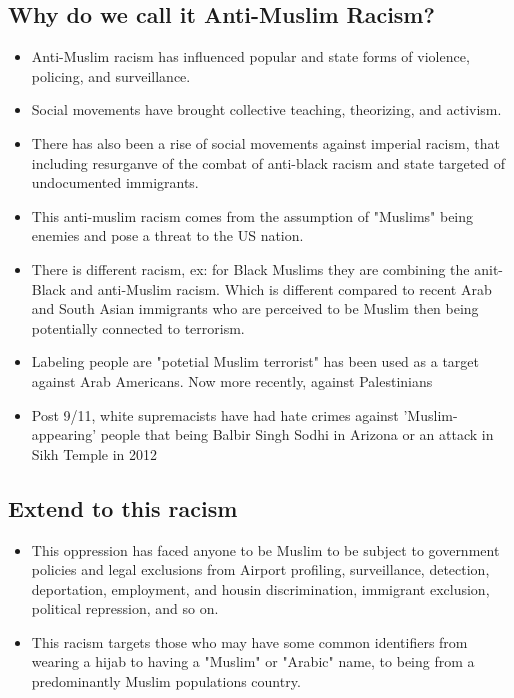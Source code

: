 \documentclass{article}
\begin{document}
  \subsection{Why do we call it Anti-Muslim Racism?}
  \begin{itemize}
    \item Anti-Muslim racism has influenced popular and state forms of
      violence, policing, and surveillance.
    \item Social movements have brought collective teaching,
      theorizing, and activism.
    \item There has also been a rise of social movements against imperial racism,
      that including resurganve of the combat of anti-black racism
      and state targeted of undocumented immigrants.
    \item This anti-muslim racism comes from the assumption of
      "Muslims" being enemies and pose a threat to the US nation.
    \item There is different racism, ex: for Black Muslims they are combining
      the anit-Black and anti-Muslim racism. Which is different compared to
      recent Arab and South Asian immigrants who are perceived to be Muslim
      then being potentially connected to terrorism.
    \item Labeling people are "potetial Muslim terrorist" has been used
      as a target against Arab Americans. Now more recently, against Palestinians
    \item Post 9/11, white supremacists have had hate crimes against 'Muslim-appearing' people
      that being Balbir Singh Sodhi in Arizona or an attack in Sikh Temple in 2012
  \end{itemize}

  \subsection{Extend to this racism}
  \begin{itemize}
    \item This oppression has faced anyone to be Muslim to be subject
      to government policies and legal exclusions from Airport profiling,
      surveillance, detection, deportation, employment, and housin discrimination, immigrant exclusion,
      political repression, and so on.
    \item This racism targets those who may have some common identifiers from wearing a hijab
      to having a "Muslim" or "Arabic" name, to being from a predominantly
      Muslim populations country.
  \end{itemize}
\end{document}
